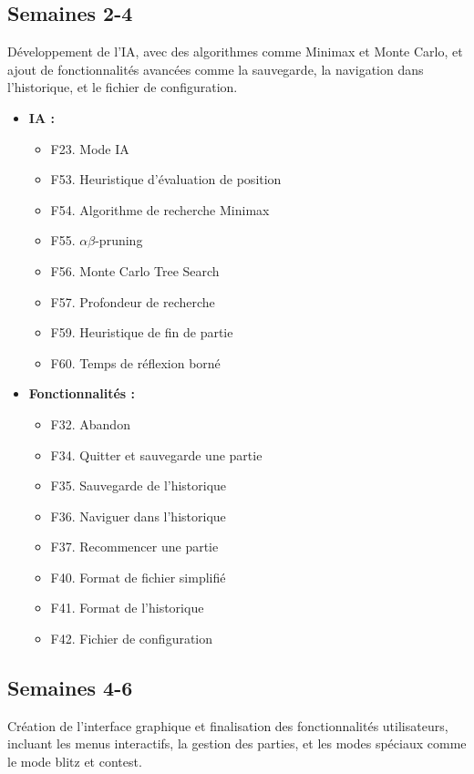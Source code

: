 \documentclass{article}
\begin{document}
\subsection{Semaines 2-4}

Développement de l'IA, avec des algorithmes comme Minimax et Monte Carlo, et ajout de fonctionnalités avancées comme la sauvegarde, la navigation dans l'historique, et le fichier de configuration.

\begin{itemize}
    \item \textbf{IA :}
    \begin{itemize}
        \item F23. Mode IA
        \item F53. Heuristique d'évaluation de position
        \item F54. Algorithme de recherche Minimax
        \item F55. $\alpha\beta$-pruning
        \item F56. Monte Carlo Tree Search
        \item F57. Profondeur de recherche
        \item F59. Heuristique de fin de partie
        \item F60. Temps de réflexion borné
    \end{itemize}
    \item \textbf{Fonctionnalités :}
    \begin{itemize}
        \item F32. Abandon
        \item F34. Quitter et sauvegarde une partie
        \item F35. Sauvegarde de l'historique
        \item F36. Naviguer dans l'historique
        \item F37. Recommencer une partie
        \item F40. Format de fichier simplifié
        \item F41. Format de l'historique
        \item F42. Fichier de configuration
    \end{itemize}
\end{itemize}

\subsection{Semaines 4-6}

Création de l'interface graphique et finalisation des fonctionnalités utilisateurs, incluant les menus interactifs, la gestion des parties, et les modes spéciaux comme le mode blitz et contest.
\end{document}
